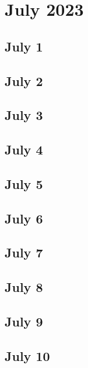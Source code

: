 %
%
%

\chapter{July 2023}
\label{intro} %

\section{July 1}

\section{July 2}

\section{July 3}

\section{July 4}

\section{July 5}

\section{July 6}

\section{July 7}

\section{July 8}

\section{July 9}

\section{July 10}

